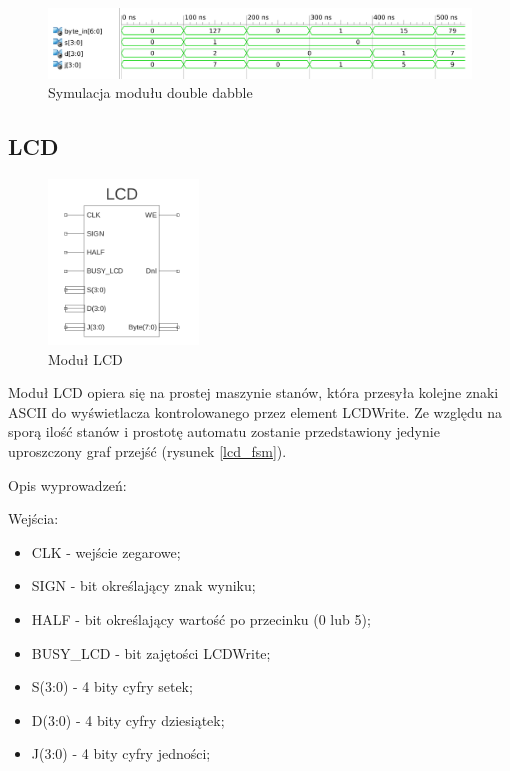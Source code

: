 \documentclass[a4paper]{article}
\begin{document}
\begin{figure}[H]
\begin{center}
\includegraphics[width=16cm]{graphics/double_dabble_symulation.png}
\end{center}
\caption{Symulacja modułu double dabble}
\label{double_dabble_symulation}
\end{figure}

\subsection{LCD}

\begin{figure}[H]
\begin{center}
\includegraphics[width=4cm]{graphics/lcd_sym.png}
\end{center}
\caption{Moduł LCD}
\label{lcd_sym}
\end{figure} 

Moduł LCD opiera się na prostej maszynie stanów, która przesyła kolejne znaki ASCII do wyświetlacza kontrolowanego przez element LCDWrite. Ze względu na sporą ilość stanów i prostotę automatu zostanie przedstawiony jedynie uproszczony graf przejść (rysunek \ref{lcd_fsm}).


Opis wyprowadzeń:

Wejścia:
\begin{itemize}
\item CLK - wejście zegarowe;
\item SIGN - bit określający znak wyniku;
\item HALF - bit określający wartość po przecinku (0 lub 5);
\item BUSY\_LCD - bit zajętości LCDWrite;
\item S(3:0) - 4 bity cyfry setek;
\item D(3:0) - 4 bity cyfry dziesiątek;
\item J(3:0) - 4 bity cyfry jedności;
\end{itemize}
\end{document}
